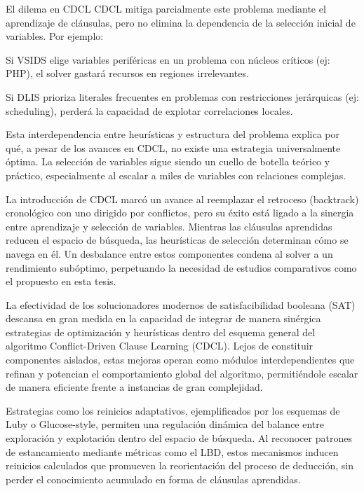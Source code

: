 \begin{conclusions}
El dilema en CDCL
CDCL mitiga parcialmente este problema mediante el aprendizaje de cláusulas, pero no elimina la dependencia de la selección inicial de variables. Por ejemplo:

Si VSIDS elige variables periféricas en un problema con núcleos críticos (ej: PHP), el solver gastará recursos en regiones irrelevantes.

Si DLIS prioriza literales frecuentes en problemas con restricciones jerárquicas (ej: scheduling), perderá la capacidad de explotar correlaciones locales.

Esta interdependencia entre heurísticas y estructura del problema explica por qué, a pesar de los avances en CDCL, no existe una estrategia universalmente óptima. La selección de variables sigue siendo un cuello de botella teórico y práctico, especialmente al escalar a miles de variables con relaciones complejas.

La introducción de CDCL marcó un avance al reemplazar el retroceso (backtrack) cronológico con uno dirigido por conflictos, pero su éxito está ligado a la sinergia entre aprendizaje y selección de variables. Mientras las cláusulas aprendidas reducen el espacio de búsqueda, las heurísticas de selección determinan cómo se navega en él. Un desbalance entre estos componentes condena al solver a un rendimiento subóptimo, perpetuando la necesidad de estudios comparativos como el propuesto en esta tesis.

La efectividad de los solucionadores modernos de satisfacibilidad booleana (SAT) descansa en gran medida en la capacidad de integrar de manera sin\'ergica estrategias de optimizaci\'on y heur\'isticas dentro del esquema general del algoritmo Conflict-Driven Clause Learning (CDCL). Lejos de constituir componentes aislados, estas mejoras operan como m\'odulos interdependientes que refinan y potencian el comportamiento global del algoritmo, permiti\'endole escalar de manera eficiente frente a instancias de gran complejidad.

Estrategias como los reinicios adaptativos, ejemplificados por los esquemas de Luby o Glucose-style, permiten una regulaci\'on din\'amica del balance entre exploraci\'on y explotaci\'on dentro del espacio de b\'usqueda. Al reconocer patrones de estancamiento mediante m\'etricas como el LBD, estos mecanismos inducen reinicios calculados que promueven la reorientaci\'on del proceso de deducci\'on, sin perder el conocimiento acumulado en forma de cl\'ausulas aprendidas.


\end{conclusions}
